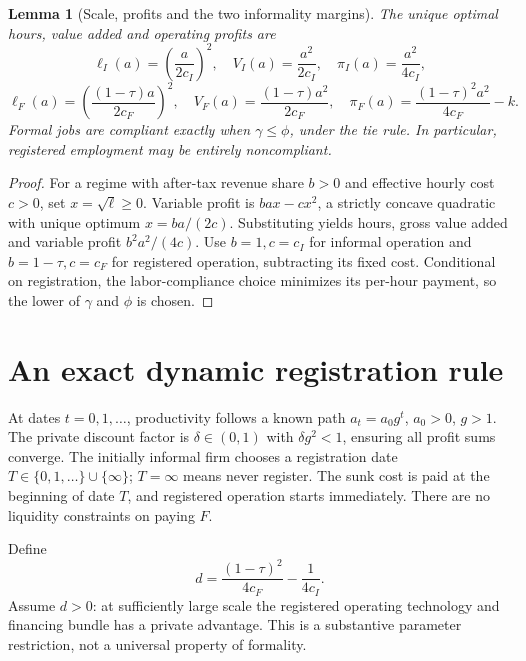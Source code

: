 \documentclass[11pt,a4paper]{article}
\newtheorem{lemma}[theorem]{Lemma}
\theoremstyle{definition}
\theoremstyle{remark}
\begin{document}
\begin{lemma}[Scale, profits and the two informality margins]\label{le:operating}
The unique optimal hours, value added and operating profits are
\[
 \ell_I(a)=\left(\frac{a}{2c_I}\right)^2,
 \quad V_I(a)=\frac{a^2}{2c_I},
 \quad \pi_I(a)=\frac{a^2}{4c_I},
\]
\[
 \ell_F(a)=\left(\frac{(1-\tau)a}{2c_F}\right)^2,
 \quad V_F(a)=\frac{(1-\tau)a^2}{2c_F},
 \quad \pi_F(a)=\frac{(1-\tau)^2a^2}{4c_F}-k.
\]
Formal jobs are compliant exactly when $\gamma\leq\phi$, under the tie rule. In particular, registered employment may be entirely noncompliant.
\end{lemma}
\begin{proof}
For a regime with after-tax revenue share $b>0$ and effective hourly cost $c>0$, set $x=\sqrt\ell\geq0$. Variable profit is $bax-cx^2$, a strictly concave quadratic with unique optimum $x=ba/(2c)$. Substituting yields hours, gross value added and variable profit $b^2a^2/(4c)$. Use $b=1,c=c_I$ for informal operation and $b=1-\tau,c=c_F$ for registered operation, subtracting its fixed cost. Conditional on registration, the labor-compliance choice minimizes its per-hour payment, so the lower of $\gamma$ and $\phi$ is chosen.
\end{proof}

\section{An exact dynamic registration rule}
At dates $t=0,1,\ldots$, productivity follows a known path $a_t=a_0g^t$, $a_0>0$, $g>1$. The private discount factor is $\delta\in(0,1)$ with $\delta g^2<1$, ensuring all profit sums converge. The initially informal firm chooses a registration date $T\in\{0,1,\ldots\}\cup\{\infty\}$; $T=\infty$ means never register. The sunk cost is paid at the beginning of date $T$, and registered operation starts immediately. There are no liquidity constraints on paying $F$.

Define
\[
 d=\frac{(1-\tau)^2}{4c_F}-\frac1{4c_I}.
\]
Assume $d>0$: at sufficiently large scale the registered operating technology and financing bundle has a private advantage. This is a substantive parameter restriction, not a universal property of formality.
\end{document}
